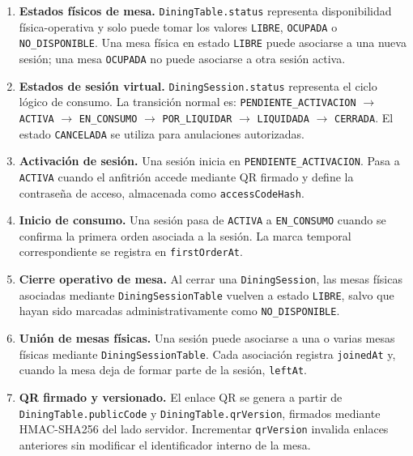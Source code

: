 \begin{enumerate}
  \item \textbf{Estados físicos de mesa.}
  \texttt{DiningTable.status} representa disponibilidad física-operativa y solo puede
  tomar los valores \texttt{LIBRE}, \texttt{OCUPADA} o \texttt{NO\_DISPONIBLE}. Una mesa
  física en estado \texttt{LIBRE} puede asociarse a una nueva sesión; una mesa
  \texttt{OCUPADA} no puede asociarse a otra sesión activa.

  \item \textbf{Estados de sesión virtual.}
  \texttt{DiningSession.status} representa el ciclo lógico de consumo. La transición
  normal es: \texttt{PENDIENTE\_ACTIVACION} $\rightarrow$ \texttt{ACTIVA}
  $\rightarrow$ \texttt{EN\_CONSUMO} $\rightarrow$ \texttt{POR\_LIQUIDAR}
  $\rightarrow$ \texttt{LIQUIDADA} $\rightarrow$ \texttt{CERRADA}. El estado
  \texttt{CANCELADA} se utiliza para anulaciones autorizadas.

  \item \textbf{Activación de sesión.}
  Una sesión inicia en \texttt{PENDIENTE\_ACTIVACION}. Pasa a \texttt{ACTIVA} cuando
  el anfitrión accede mediante QR firmado y define la contraseña de acceso, almacenada
  como \texttt{accessCodeHash}.

  \item \textbf{Inicio de consumo.}
  Una sesión pasa de \texttt{ACTIVA} a \texttt{EN\_CONSUMO} cuando se confirma la
  primera orden asociada a la sesión. La marca temporal correspondiente se registra en
  \texttt{firstOrderAt}.

  \item \textbf{Cierre operativo de mesa.}
  Al cerrar una \texttt{DiningSession}, las mesas físicas asociadas mediante
  \texttt{DiningSessionTable} vuelven a estado \texttt{LIBRE}, salvo que hayan sido
  marcadas administrativamente como \texttt{NO\_DISPONIBLE}.

  \item \textbf{Unión de mesas físicas.}
  Una sesión puede asociarse a una o varias mesas físicas mediante
  \texttt{DiningSessionTable}. Cada asociación registra \texttt{joinedAt} y, cuando la
  mesa deja de formar parte de la sesión, \texttt{leftAt}.

  \item \textbf{QR firmado y versionado.}
  El enlace QR se genera a partir de \texttt{DiningTable.publicCode} y
  \texttt{DiningTable.qrVersion}, firmados mediante HMAC-SHA256 del lado servidor.
  Incrementar \texttt{qrVersion} invalida enlaces anteriores sin modificar el identificador
  interno de la mesa.


\end{enumerate}
